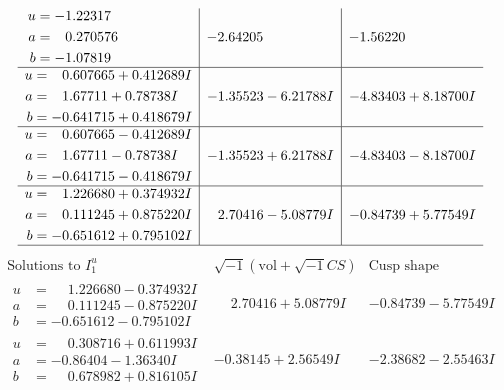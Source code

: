 \documentclass[1p]{elsarticle_modified}
\theoremstyle{definition}
\newcommand{\I}{\sqrt{-1}}
\begin{document}
$$\begin{array}{c|c|c}
\begin{aligned}
u &= -1.22317\phantom{ +0.000000I} \\
a &= \phantom{-}0.270576\phantom{ +0.000000I} \\
b &= -1.07819\phantom{ +0.000000I}\end{aligned}
 & -2.64205\phantom{ +0.000000I} & -1.56220\phantom{ +0.000000I} \\ \hline\begin{aligned}
u &= \phantom{-}0.607665 + 0.412689 I \\
a &= \phantom{-}1.67711 + 0.78738 I \\
b &= -0.641715 + 0.418679 I\end{aligned}
 & -1.35523 - 6.21788 I & -4.83403 + 8.18700 I \\ \hline\begin{aligned}
u &= \phantom{-}0.607665 - 0.412689 I \\
a &= \phantom{-}1.67711 - 0.78738 I \\
b &= -0.641715 - 0.418679 I\end{aligned}
 & -1.35523 + 6.21788 I & -4.83403 - 8.18700 I \\ \hline\begin{aligned}
u &= \phantom{-}1.226680 + 0.374932 I \\
a &= \phantom{-}0.111245 + 0.875220 I \\
b &= -0.651612 + 0.795102 I\end{aligned}
 & \phantom{-}2.70416 - 5.08779 I & -0.84739 + 5.77549 I\\
 \hline 
 \end{array}$$\newpage$$\begin{array}{c|c|c}  
\text{Solutions to }I^u_{1}& \I (\text{vol} + \sqrt{-1}CS) & \text{Cusp shape}\\
 \hline 
\begin{aligned}
u &= \phantom{-}1.226680 - 0.374932 I \\
a &= \phantom{-}0.111245 - 0.875220 I \\
b &= -0.651612 - 0.795102 I\end{aligned}
 & \phantom{-}2.70416 + 5.08779 I & -0.84739 - 5.77549 I \\ \hline\begin{aligned}
u &= \phantom{-}0.308716 + 0.611993 I \\
a &= -0.86404 - 1.36340 I \\
b &= \phantom{-}0.678982 + 0.816105 I\end{aligned}
 & -0.38145 + 2.56549 I & -2.38682 - 2.55463 I \\ \hline\begin{aligned}

\end{aligned}
\end{array}$$
\end{document}
